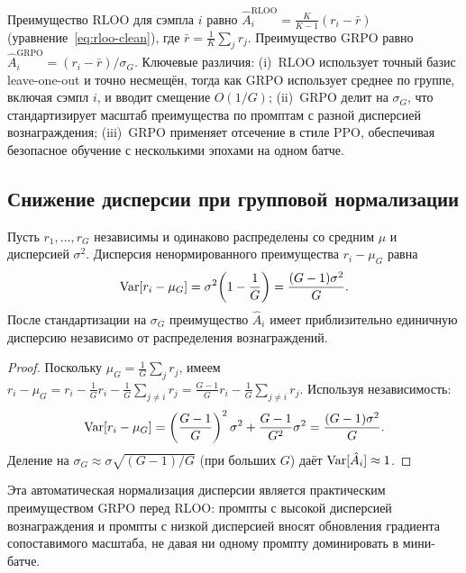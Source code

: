 Преимущество RLOO для сэмпла $i$ равно $\hat{A}_i^{\mathrm{RLOO}} = \frac{K}{K-1}(r_i - \bar{r})$ (уравнение~\eqref{eq:rloo-clean}), где $\bar{r} = \frac{1}{K}\sum_j r_j$. Преимущество GRPO равно $\hat{A}_i^{\mathrm{GRPO}} = (r_i - \bar{r}) / \sigma_G$. Ключевые различия: (i)~RLOO использует точный базис leave-one-out и точно несмещён, тогда как GRPO использует среднее по группе, включая сэмпл $i$, и вводит смещение $O(1/G)$; (ii)~GRPO делит на $\sigma_G$, что стандартизирует масштаб преимущества по промптам с разной дисперсией вознаграждения; (iii)~GRPO применяет отсечение в стиле PPO, обеспечивая безопасное обучение с несколькими эпохами на одном батче.

\subsection{Снижение дисперсии при групповой нормализации}

\begin{proposition}
\label{prop:grpo-variance}
Пусть $r_1, \ldots, r_G$ независимы и одинаково распределены со средним $\mu$ и дисперсией $\sigma^2$. Дисперсия ненормированного преимущества $r_i - \mu_G$ равна
\begin{equation}
\label{eq:grpo-var-unnorm}
\operatorname{Var}[r_i - \mu_G] = \sigma^2\!\left(1 - \frac{1}{G}\right) = \frac{(G-1)\sigma^2}{G}.
\end{equation}
После стандартизации на $\sigma_G$ преимущество $\hat{A}_i$ имеет приблизительно единичную дисперсию независимо от распределения вознаграждений.
\end{proposition}

\begin{proof}
Поскольку $\mu_G = \frac{1}{G}\sum_j r_j$, имеем $r_i - \mu_G = r_i - \frac{1}{G}r_i - \frac{1}{G}\sum_{j \neq i} r_j = \frac{G-1}{G}r_i - \frac{1}{G}\sum_{j \neq i} r_j$. Используя независимость:
\[
\operatorname{Var}[r_i - \mu_G] = \left(\frac{G-1}{G}\right)^2 \sigma^2 + \frac{G-1}{G^2}\sigma^2 = \frac{(G-1)\sigma^2}{G}.
\]
Деление на $\sigma_G \approx \sigma\sqrt{(G-1)/G}$ (при больших $G$) даёт $\operatorname{Var}[\hat{A}_i] \approx 1$.
\end{proof}

Эта автоматическая нормализация дисперсии является практическим преимуществом GRPO перед RLOO: промпты с высокой дисперсией вознаграждения и промпты с низкой дисперсией вносят обновления градиента сопоставимого масштаба, не давая ни одному промпту доминировать в мини-батче.

